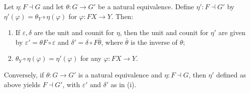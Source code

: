 Let $\eta: F \dashv G$ and let $\theta: G \to G'$ be a natural equivalence. Define $\eta': F \dashv G'$ by $\eta'(\varphi) = \theta_Y \circ \eta(\varphi)$ for $\varphi: FX \to Y$. Then:
\begin{enumerate}
\item[(i)] If $\varepsilon, \delta$ are the unit and counit for $\eta$, then the unit and counit for $\eta'$ are given by $\varepsilon' = \theta F \circ \varepsilon$ and $\delta' = \delta \circ F \bar{\theta}$, where $\bar{\theta}$ is the inverse of $\theta$;
\item[(ii)] $\theta_Y \circ \eta(\varphi) = \eta'(\varphi)$ for any $\varphi: FX \to Y$.
\end{enumerate}
Conversely, if $\theta: G \to G'$ is a natural equivalence and $\eta: F \dashv G$, then $\eta'$ defined as above yields $F \dashv G'$, with $\varepsilon'$ and $\delta'$ as in (i).
